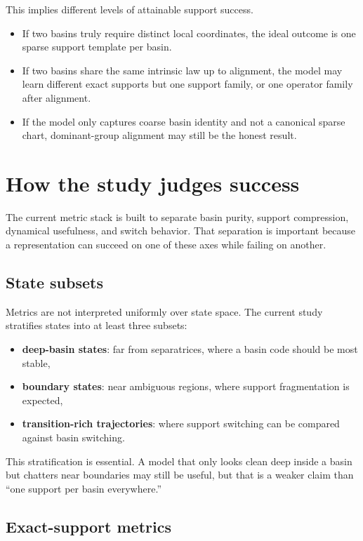 \documentclass[11pt]{article}
\begin{document}
This implies different levels of attainable support success.
\begin{itemize}[leftmargin=1.5em]
    \item If two basins truly require distinct local coordinates, the ideal
    outcome is one sparse support template per basin.
    \item If two basins share the same intrinsic law up to alignment, the model
    may learn different exact supports but one support family, or one operator
    family after alignment.
    \item If the model only captures coarse basin identity and not a canonical
    sparse chart, dominant-group alignment may still be the honest result.
\end{itemize}

\section{How the study judges success}

The current metric stack is built to separate basin purity, support
compression, dynamical usefulness, and switch behavior. That separation is
important because a representation can succeed on one of these axes while
failing on another.

\subsection{State subsets}

Metrics are not interpreted uniformly over state space. The current study
stratifies states into at least three subsets:
\begin{itemize}[leftmargin=1.5em]
    \item \textbf{deep-basin states}: far from separatrices, where a basin code
    should be most stable,
    \item \textbf{boundary states}: near ambiguous regions, where support
    fragmentation is expected,
    \item \textbf{transition-rich trajectories}: where support switching can be
    compared against basin switching.
\end{itemize}

This stratification is essential. A model that only looks clean deep inside a
basin but chatters near boundaries may still be useful, but that is a weaker
claim than ``one support per basin everywhere.''

\subsection{Exact-support metrics}
\end{document}
